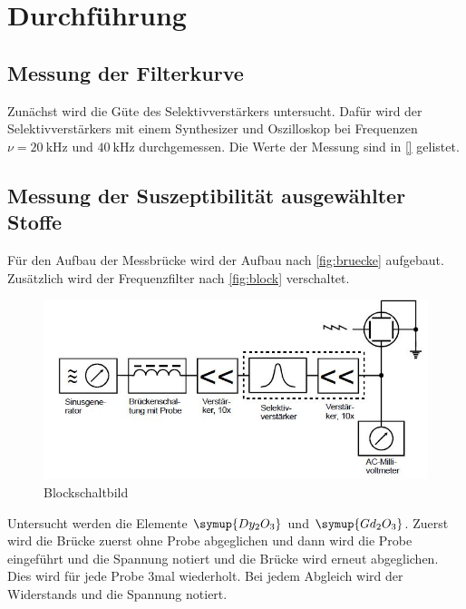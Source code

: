 \section{Durchführung}

\subsection{Messung der Filterkurve}
Zunächst wird die Güte des Selektivverstärkers untersucht. Dafür wird der Selektivverstärkers mit einem Synthesizer und Oszilloskop bei Frequenzen $\nu = \SI{20}{\kilo\hertz}$ und
$\SI{40}{\kilo\hertz}$ durchgemessen. Die Werte der Messung sind in \autoref{} gelistet.

\subsection{Messung der Suszeptibilität ausgewählter Stoffe} 
Für den Aufbau der Messbrücke wird der Aufbau nach \autoref{fig:bruecke} aufgebaut. Zusätzlich wird der Frequenzfilter nach \autoref{fig:block} verschaltet.
\begin{figure} [H]
    \centering
    \includegraphics[scale=0.75]{Bilder/Blockschaltbild.jpg}
    \caption{Blockschaltbild \cite{V606}}
    \label{fig:block}
\end{figure}

\noindent
Untersucht werden die Elemente $\symup{Dy_2O_3}$ und $\symup{Gd_2O_3}$.
Zuerst wird die Brücke zuerst ohne Probe abgeglichen und dann wird die Probe eingeführt und die Spannung notiert und die Brücke wird erneut abgeglichen. Dies wird für jede
Probe 3mal wiederholt. Bei jedem Abgleich wird der Widerstands und die Spannung notiert.



